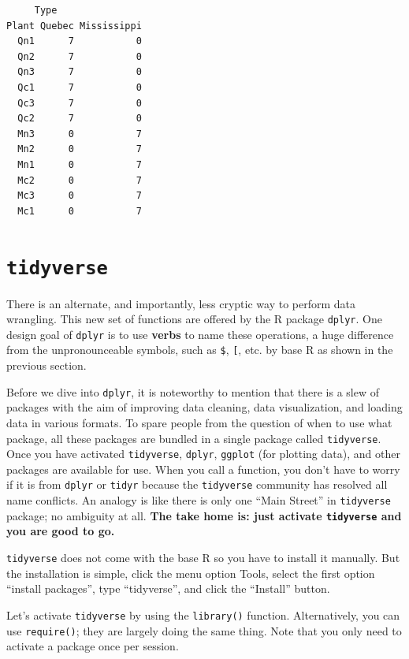 \documentclass[
  letterpaper,
]{book}
\begin{document}
\begin{verbatim}
     Type
Plant Quebec Mississippi
  Qn1      7           0
  Qn2      7           0
  Qn3      7           0
  Qc1      7           0
  Qc3      7           0
  Qc2      7           0
  Mn3      0           7
  Mn2      0           7
  Mn1      0           7
  Mc2      0           7
  Mc3      0           7
  Mc1      0           7
\end{verbatim}

\section{\texorpdfstring{\texttt{tidyverse}}{tidyverse}}\label{tidyverse}

There is an alternate, and importantly, less cryptic way to perform data
wrangling. This new set of functions are offered by the R package
\texttt{dplyr}. One design goal of \texttt{dplyr} is to use
\textbf{verbs} to name these operations, a huge difference from the
unpronounceable symbols, such as \texttt{\$}, \texttt{{[}}, etc. by base
R as shown in the previous section.

Before we dive into \texttt{dplyr}, it is noteworthy to mention that
there is a slew of packages with the aim of improving data cleaning,
data visualization, and loading data in various formats. To spare people
from the question of when to use what package, all these packages are
bundled in a single package called \texttt{tidyverse}. Once you have
activated \texttt{tidyverse}, \texttt{dplyr}, \texttt{ggplot} (for
plotting data), and other packages are available for use. When you call
a function, you don't have to worry if it is from \texttt{dplyr} or
\texttt{tidyr} because the \texttt{tidyverse} community has resolved all
name conflicts. An analogy is like there is only one ``Main Street'' in
\texttt{tidyverse} package; no ambiguity at all. \textbf{The take home
is: just activate \texttt{tidyverse} and you are good to go.}

\texttt{tidyverse} does not come with the base R so you have to install
it manually. But the installation is simple, click the menu option
Tools, select the first option ``install packages'', type ``tidyverse'',
and click the ``Install'' button.

Let's activate \texttt{tidyverse} by using the \texttt{library()}
function. Alternatively, you can use \texttt{require()}; they are
largely doing the same thing. Note that you only need to activate a
package once per session.
\end{document}
